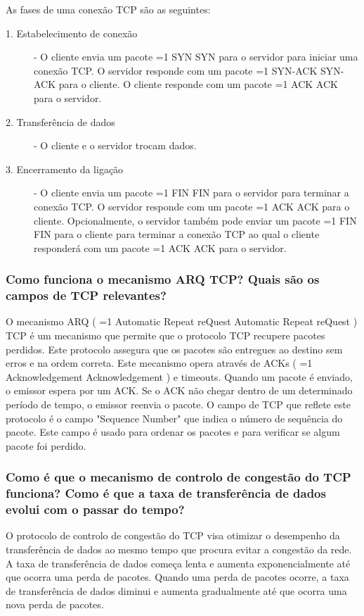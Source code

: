 \documentclass[11pt,a4paper,twocolumn]{article}
\newcommand{\hl}[2][1]{%
  \ifnum#1=1\relax
    \textcolor{text-hl1}{#2}%
  \else
    \textcolor{text-hl2}{#2}%
  \fi
}
\begin{document}
As fases de uma conexão TCP são as seguintes:
\begin{description}
    \item[1. Estabelecimento de conexão] - O cliente envia um pacote \hl{SYN} para o servidor para iniciar uma conexão TCP. O servidor responde com um pacote \hl{SYN-ACK} para o cliente. O cliente responde com um pacote \hl{ACK} para o servidor.
    \item[2. Transferência de dados] - O cliente e o servidor trocam dados.
    \item[3. Encerramento da ligação] - O cliente envia um pacote \hl{FIN} para o servidor para terminar a conexão TCP. O servidor responde com um pacote \hl{ACK} para o cliente. Opcionalmente, o servidor também pode enviar um pacote \hl{FIN} para o cliente para terminar a conexão TCP ao qual o cliente responderá com um pacote \hl{ACK} para o servidor. 
\end{description}

\subsubsection{Como funciona o mecanismo ARQ TCP? Quais são os campos de TCP relevantes?}

O mecanismo ARQ (\hl{Automatic Repeat reQuest}) TCP é um mecanismo que permite que o protocolo TCP recupere pacotes perdidos. Este protocolo assegura que os pacotes são entregues ao destino sem erros e na ordem correta. Este mecanismo opera através de ACKs (\hl[2]{Acknowledgement}) e timeouts. Quando um pacote é enviado, o emissor espera por um ACK. Se o ACK não chegar dentro de um determinado período de tempo, o emissor reenvia o pacote.
O campo de TCP que reflete este protocolo é o campo "Sequence Number" que indica o número de sequência do pacote. Este campo é usado para ordenar os pacotes e para verificar se algum pacote foi perdido. 

\subsubsection{Como é que o mecanismo de controlo de congestão do TCP funciona? Como é que a taxa de transferência de dados evolui com o passar do tempo?}

O protocolo de controlo de congestão do TCP visa otimizar o desempenho da transferência de dados ao mesmo tempo que procura evitar a congestão da rede. A taxa de transferência de dados começa lenta e aumenta exponencialmente até que ocorra uma perda de pacotes. Quando uma perda de pacotes ocorre, a taxa de transferência de dados diminui e aumenta gradualmente até que ocorra uma nova perda de pacotes.
\end{document}
